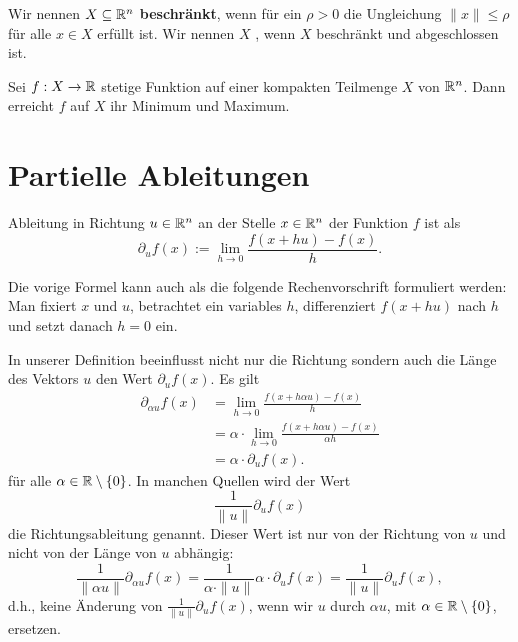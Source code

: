 \begin{defn} 
	Wir nennen $X \subseteq \mathbb{R}^n$ \textbf{beschränkt}, wenn für ein $\rho > 0$ die Ungleichung $\|x\| \le \rho$ für alle $x \in X$ erfüllt ist. Wir nennen $X$ , wenn $X$ beschränkt und abgeschlossen ist. 
\end{defn} 

\begin{thm}
	Sei $f : X \to \mathbb{R}$ stetige Funktion auf einer kompakten Teilmenge $X$ von $\mathbb{R}^n$. Dann erreicht $f$ auf $X$ ihr Minimum und Maximum.
\end{thm} 


\section{Partielle Ableitungen}

\begin{defn}[Richtungsableitung]
	Ableitung in Richtung $u \in \mathbb{R}^n$ an der Stelle $x \in \mathbb{R}^n$ der Funktion $f$ ist als 
	\[
		\partial_{u} f (x) := \lim_{h \to 0} \frac{f(x+ h u) - f(x)}{h}.
	\]
\end{defn} 

\begin{bem}
	Die vorige Formel kann auch als die folgende Rechenvorschrift formuliert werden: Man fixiert $x$ und $u$, betrachtet ein variables $h$, differenziert $f(x+ h u)$ nach $h$ und setzt danach $h=0$ ein. 
\end{bem} 

\begin{bem}
	In unserer Definition beeinflusst nicht nur die Richtung sondern auch die Länge des Vektors $u$ den Wert $\partial_{u} f(x)$. Es gilt
	\begin{align*}
		\partial_{ \alpha u} f(x) & = \lim_{h \to 0} \frac{f(x+ h \alpha u) - f(x)}{h}
		\\ & = \alpha \cdot \lim_{h \to 0} \frac{f(x+ h \alpha u) - f(x)}{\alpha h}
		\\ & = \alpha \cdot \partial_{u} f(x). 
	\end{align*}
	für alle $\alpha \in \mathbb{R} \setminus \{0\}$. 
 	In manchen Quellen wird der Wert 
 	\[
 		\frac{1}{\|u\|} \partial_{u} f(x)
 	\]
 	die Richtungsableitung genannt. Dieser Wert ist nur von der Richtung von $u$ und nicht von der Länge von $u$ abhängig: 
 	\[
 		\frac{1}{\|\alpha u\|} \partial_{\alpha u} f(x) = \frac{1}{\alpha \cdot \| u\|} \alpha \cdot \partial_{ u} f(x) = \frac{1}{\|u\|} \partial_{u} f(x),
 	\]
 	d.h., keine Änderung von $\frac{1}{\|u\|} \partial_{u} f(x)$, wenn wir $u$ durch $\alpha u$, mit $\alpha \in \mathbb{R} \setminus \{0\}$, ersetzen. 
\end{bem} 


